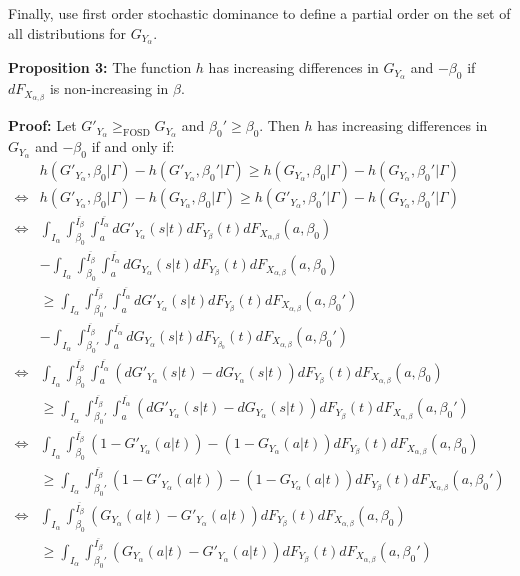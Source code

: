 \documentclass[12pt]{article}
\begin{document}
Finally, use first order stochastic dominance to define a partial order on the set of all distributions for $G_{Y_\alpha}$. 

\textbf{Proposition 3:} 
The function $h$ has increasing differences in $G_{Y_\alpha}$ and $-\beta_0$ if $dF_{X_{\alpha,\beta}}$ is non-increasing in $\beta$. 

\textbf{Proof:}
Let $G'_{Y_\alpha}\mathop{\ge}_{\text{FOSD}} G_{Y_\alpha}$ and $\beta_0' \ge \beta_0$. Then $h$ has increasing differences in $G_{Y_\alpha}$ and $-\beta_0$ if and only if:
\begin{align*}
& h(G'_{Y_\alpha},\beta_0|\Gamma) - h(G'_{Y_\alpha},\beta_0'|\Gamma) \ge h(G_{Y_\alpha},\beta_0|\Gamma) - h(G_{Y_\alpha},\beta_0'|\Gamma)\\
\iff & h(G'_{Y_\alpha},\beta_0|\Gamma) - h(G_{Y_\alpha},\beta_0|\Gamma) \ge h(G'_{Y_\alpha},\beta_0'|\Gamma) - h(G_{Y_\alpha},\beta_0'|\Gamma)\\
\iff & \int_{I_{\alpha}} \int_{\beta_0}^{\overline{I_{\beta}}} \int_{a}^{\overline{I_{\alpha}}} dG'_{Y_{\alpha}}(s|t) dF_{Y_{\beta}}(t) dF_{X_{\alpha,\beta}}(a,\beta_0) \\ 
& - \int_{I_{\alpha}} \int_{\beta_0}^{\overline{I_{\beta}}} \int_{a}^{\overline{I_{\alpha}}} dG_{Y_{\alpha}}(s|t) dF_{Y_{\beta}}(t) dF_{X_{\alpha,\beta}}(a,\beta_0) \\
& \ge \int_{I_{\alpha}} \int_{\beta_0'}^{\overline{I_{\beta}}} \int_{a}^{\overline{I_{\alpha}}} dG'_{Y_{\alpha}}(s|t) dF_{Y_{\beta}}(t) dF_{X_{\alpha,\beta}}(a,\beta_0') \\
& - \int_{I_{\alpha}} \int_{\beta_0'}^{\overline{I_{\beta}}} \int_{a}^{\overline{I_{\alpha}}} dG_{Y_{\alpha}}(s|t) dF_{Y_{\beta_0}}(t) dF_{X_{\alpha,\beta}}(a,\beta_0')\\
\iff & \int_{I_{\alpha}} \int_{\beta_0}^{\overline{I_{\beta}}} \int_{a}^{\overline{I_{\alpha}}} (dG'_{Y_{\alpha}}(s|t) - dG_{Y_{\alpha}}(s|t)) dF_{Y_{\beta}}(t) dF_{X_{\alpha,\beta}}(a,\beta_0) \\ 
& \ge \int_{I_{\alpha}} \int_{\beta_0'}^{\overline{I_{\beta}}} \int_{a}^{\overline{I_{\alpha}}} (dG'_{Y_{\alpha}}(s|t) - dG_{Y_{\alpha}}(s|t)) dF_{Y_{\beta}}(t) dF_{X_{\alpha,\beta}}(a,\beta_0')\\
\iff & \int_{I_{\alpha}} \int_{\beta_0}^{\overline{I_{\beta}}} (1-G'_{Y_{\alpha}}(a|t)) - (1-G_{Y_{\alpha}}(a|t)) dF_{Y_{\beta}}(t) dF_{X_{\alpha,\beta}}(a,\beta_0) \\ 
& \ge \int_{I_{\alpha}} \int_{\beta_0'}^{\overline{I_{\beta}}} (1-G'_{Y_{\alpha}}(a|t)) - (1-G_{Y_{\alpha}}(a|t)) dF_{Y_{\beta}}(t) dF_{X_{\alpha,\beta}}(a,\beta_0') \\ 
\iff & \int_{I_{\alpha}} \int_{\beta_0}^{\overline{I_{\beta}}} (G_{Y_{\alpha}}(a|t) - G'_{Y_{\alpha}}(a|t)) dF_{Y_{\beta}}(t) dF_{X_{\alpha,\beta}}(a,\beta_0) \\ 
& \ge \int_{I_{\alpha}} \int_{\beta_0'}^{\overline{I_{\beta}}} (G_{Y_{\alpha}}(a|t) - G'_{Y_{\alpha}}(a|t)) dF_{Y_{\beta}}(t) dF_{X_{\alpha,\beta}}(a,\beta_0')
\end{align*}
\end{document}
